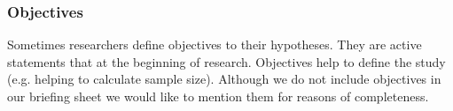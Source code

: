 \subsubsection{Objectives}

 Sometimes researchers define objectives to their hypotheses. They are active statements that  \cite[p. 280]{Farrugia2009} at the beginning of research. Objectives help to define the study (e.g. helping to calculate sample size). \cite{Farrugia2009,Vickers} Although we do not include objectives in our briefing sheet we would like to mention them for reasons of completeness.